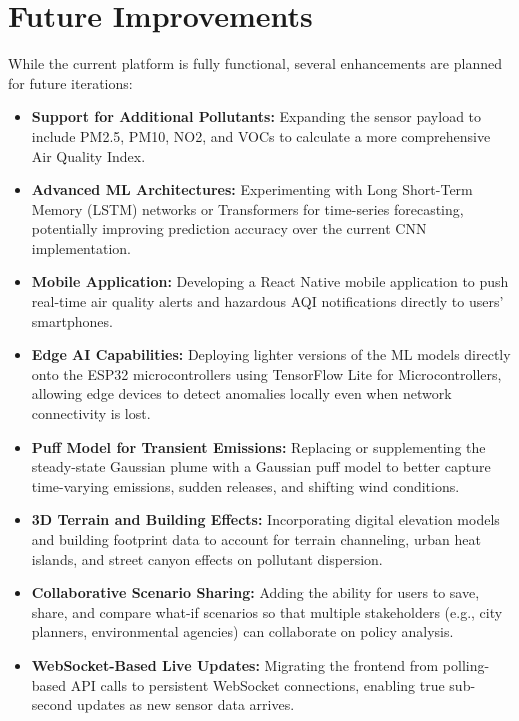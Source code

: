 \documentclass[a4paper, 12pt]{report}
\begin{document}
\section{Future Improvements}
While the current platform is fully functional, several enhancements are planned for future iterations:
\begin{itemize}
\item \textbf{Support for Additional Pollutants:}
Expanding the sensor payload to include PM2.5, PM10, NO2, and VOCs to calculate a more comprehensive Air Quality Index.
\item \textbf{Advanced ML Architectures:}
Experimenting with Long Short-Term Memory (LSTM) networks or Transformers for time-series forecasting, potentially improving prediction accuracy over the current CNN implementation.
\item \textbf{Mobile Application:}
Developing a React Native mobile application to push real-time air quality alerts and hazardous AQI notifications directly to users' smartphones.
\item \textbf{Edge AI Capabilities:}
Deploying lighter versions of the ML models directly onto the ESP32 microcontrollers using TensorFlow Lite for Microcontrollers, allowing edge devices to detect anomalies locally even when network connectivity is lost.
\item \textbf{Puff Model for Transient Emissions:}
Replacing or supplementing the steady-state Gaussian plume with a Gaussian puff model to better capture time-varying emissions, sudden releases, and shifting wind conditions.
\item \textbf{3D Terrain and Building Effects:}
Incorporating digital elevation models and building footprint data to account for terrain channeling, urban heat islands, and street canyon effects on pollutant dispersion.
\item \textbf{Collaborative Scenario Sharing:}
Adding the ability for users to save, share, and compare what-if scenarios so that multiple stakeholders (e.g., city planners, environmental agencies) can collaborate on policy analysis.
\item \textbf{WebSocket-Based Live Updates:}
Migrating the frontend from polling-based API calls to persistent WebSocket connections, enabling true sub-second updates as new sensor data arrives.
\end{itemize}
\end{document}
